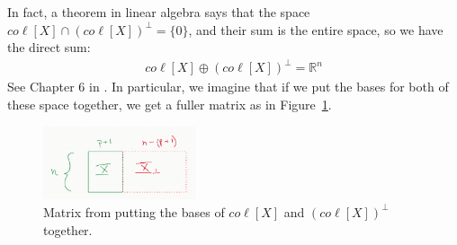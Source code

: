 \documentclass[12pt, a4paper]{article}
\theoremstyle{definition}
\begin{document}
	In fact, a theorem in linear algebra says that the space $co\ell [X]\cap  (co\ell[X])^\perp=\{0\}$,
	and their sum is the entire space, so we have the direct sum:
	\begin{align*}
		co\ell [X]\oplus (co\ell [X])^\perp = \mathbb{R}^n
	\end{align*}
	See Chapter 6 in \cite{axler}. In particular, we imagine that if we put the bases
	for both of these space together, we get a fuller matrix as in Figure~\ref{fig:mat-ortho-decomp}.
	\begin{figure}
		\centering
		\includegraphics[width=0.4\textwidth]{matrix-orthogonal-decomposition}
		\caption{Matrix from putting the bases of $co\ell [X]$ and $(co\ell[X])^\perp$ together.}
		\label{fig:mat-ortho-decomp}
	\end{figure}
	\pagebreak
	\printbibliography
\end{document}
